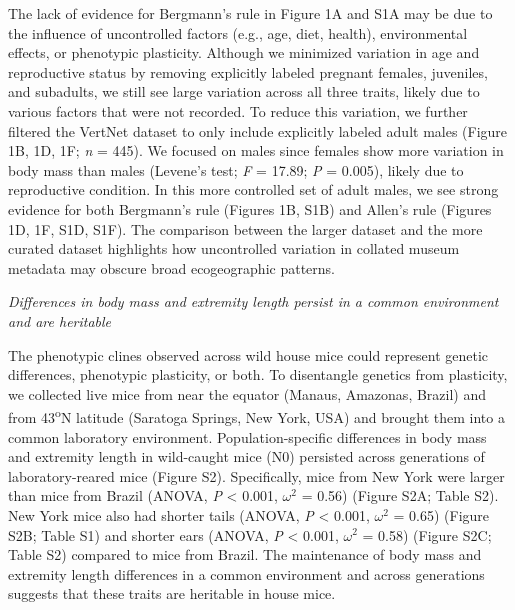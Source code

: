 \documentclass[
]{article}
\begin{document}
The lack of evidence for Bergmann's rule in Figure 1A and S1A may be due
to the influence of uncontrolled factors (e.g., age, diet, health),
environmental effects, or phenotypic plasticity. Although we minimized
variation in age and reproductive status by removing explicitly labeled
pregnant females, juveniles, and subadults, we still see large variation
across all three traits, likely due to various factors that were not
recorded. To reduce this variation, we further filtered the VertNet
dataset to only include explicitly labeled adult males (Figure 1B, 1D,
1F; \emph{n} = 445). We focused on males since females show more
variation in body mass than males (Levene's test; \emph{F} = 17.89;
\emph{P} = 0.005), likely due to reproductive condition. In this more
controlled set of adult males, we see strong evidence for both
Bergmann's rule (Figures 1B, S1B) and Allen's rule (Figures 1D, 1F, S1D,
S1F). The comparison between the larger dataset and the more curated
dataset highlights how uncontrolled variation in collated museum
metadata may obscure broad ecogeographic patterns.

\vspace{3.5mm}

\noindent\emph{Differences in body mass and extremity length persist in
a common environment and are heritable}

The phenotypic clines observed across wild house mice could represent
genetic differences, phenotypic plasticity, or both. To disentangle
genetics from plasticity, we collected live mice from near the equator
(Manaus, Amazonas, Brazil) and from 43\textsuperscript{o}N latitude
(Saratoga Springs, New York, USA) and brought them into a common
laboratory environment. Population-specific differences in body mass and
extremity length in wild-caught mice (N0) persisted across generations
of laboratory-reared mice (Figure S2). Specifically, mice from New York
were larger than mice from Brazil (ANOVA, \emph{P} \textless{} 0.001,
\(\omega^2\) = 0.56) (Figure S2A; Table S2). New York mice also had
shorter tails (ANOVA, \emph{P} \textless{} 0.001, \(\omega^2\) = 0.65)
(Figure S2B; Table S1) and shorter ears (ANOVA, \emph{P} \textless{}
0.001, \(\omega^2\) = 0.58) (Figure S2C; Table S2) compared to mice from
Brazil. The maintenance of body mass and extremity length differences in
a common environment and across generations suggests that these traits
are heritable in house mice.
\end{document}
